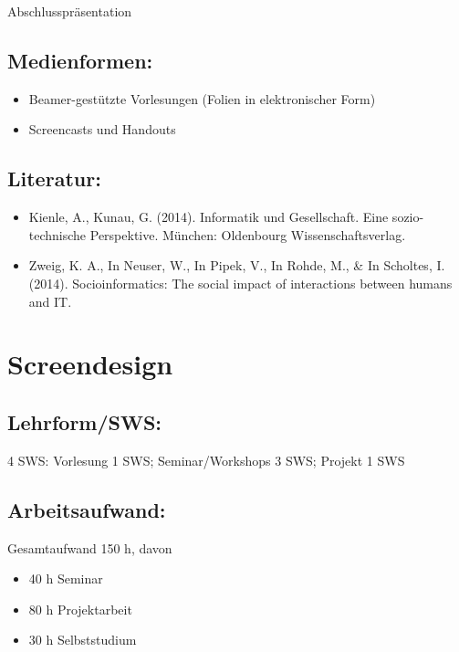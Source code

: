 Abschlusspräsentation

\section{Medienformen:}\label{medienformen-24}

\begin{itemize}
\tightlist
\item
  Beamer-gestützte Vorlesungen (Folien in elektronischer Form)
\item
  Screencasts und Handouts
\end{itemize}

\section{Literatur:}\label{literatur-24}

\begin{itemize}
\tightlist
\item
  Kienle, A., Kunau, G. (2014). Informatik und Gesellschaft. Eine
  sozio-technische Perspektive. München: Oldenbourg Wissenschaftsverlag.
\item
  Zweig, K. A., In Neuser, W., In Pipek, V., In Rohde, M., \& In
  Scholtes, I. (2014). Socioinformatics: The social impact of
  interactions between humans and IT.
\end{itemize}

\chapter{Screendesign}\label{screendesign}

\section{Lehrform/SWS:}\label{lehrformsws-25}

4 SWS: Vorlesung 1 SWS; Seminar/Workshops 3 SWS; Projekt 1 SWS

\section{Arbeitsaufwand:}\label{arbeitsaufwand-24}

Gesamtaufwand 150 h, davon

\begin{itemize}
\tightlist
\item
  40 h Seminar
\item
  80 h Projektarbeit\\
\item
  30 h Selbststudium
\end{itemize}

